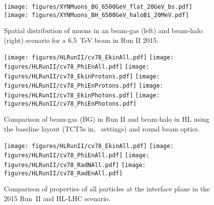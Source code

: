 \begin{figure}
  \centering
    \texttt{[image: figures/XYNMuons\_BG\_6500GeV\_flat\_20GeV\_bs.pdf]}  
    \texttt{[image: figures/XYNMuons\_BH\_6500GeV\_haloB1\_20MeV.pdf]}
  \caption{Spatial distribution of muons in an beam-gas (left) and beam-halo (right) scenario for a 6.5~TeV beam in Run II 2015. 
    \label{fig:XYNMuons2}}
\end{figure}

\begin{figure}
\begin{center}
  \texttt{[image: figures/HLRunII/cv78\_EkinAll.pdf]}
  \texttt{[image: figures/HLRunII/cv78\_PhiEnAll.pdf]}
  \texttt{[image: figures/HLRunII/cv78\_EkinProtons.pdf]}
  \texttt{[image: figures/HLRunII/cv78\_PhiEnProtons.pdf]}
  \texttt{[image: figures/HLRunII/cv78\_EkinPhotons.pdf]}
  \texttt{[image: figures/HLRunII/cv78\_PhiEnPhotons.pdf]}
\end{center}
\vspace{-0.6cm}
 \caption{Comparison of beam-gas (BG) in Run II and beam-halo in HL using the baseline layout (TCT5s in, \twosigmaret~settings) and round beam optics.
  \label{fig:hlrun22}}
\end{figure}




\clearpage

\begin{figure}
\begin{center}
  \texttt{[image: figures/HLRunII/cv78\_EkinAll.pdf]}
  \texttt{[image: figures/HLRunII/cv78\_PhiEnAll.pdf]}
  \texttt{[image: figures/HLRunII/cv78\_RadNAll.pdf]}
  \texttt{[image: figures/HLRunII/cv78\_RadEnAll.pdf]}      
\end{center}
\vspace{-0.6cm}
 \caption{Comparison of properties of all particles at the interface plane in the 2015 Run~II and HL-LHC scenario.
  \label{fig:compHLRun2All}}
\end{figure}

